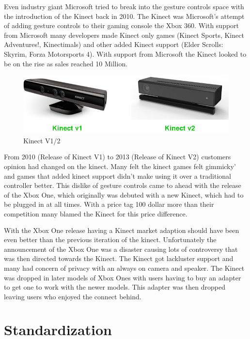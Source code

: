Even industry giant Microsoft tried to break into the gesture controls space with the introduction of the Kinect back in 2010. \cite{kinect} The Kinect was Microsoft's attempt of adding gesture controls to their gaming console the Xbox 360. With support from Microsoft many developers made Kinect only games (Kinect Sports, Kinect Adventures!, Kinectimals) and other added Kinect support (Elder Scrolls: Skyrim, Forza Motorsports 4). With support from Microsoft the Kinect looked to be on the rise as sales reached 10 Million. \cite{kinectsales}

\begin{figure}[H]
  \includegraphics[width=\linewidth]{img/Kinect.png}
  \caption{Kinect V1/2}
  \label{fig:KINECT}
\end{figure}

From 2010 (Release of Kinect V1) to 2013 (Release of Kinect V2) customers opinion had changed on the kinect. Many felt the kinect games felt gimmicky' and games that added kinect support didn't make using it over a traditional controller better. This dislike of gesture controls came to ahead with the release of the Xbox One, which originally was debuted with a new Kinect, which had to be plugged in at all times. With a price tag 100 dollar more than their competition many blamed the Kinect for this price difference. 

With the Xbox One release having a Kinect market adaption should have been even better than the previous iteration of the kinect. Unfortunately the announcement of the Xbox One was  a disaster causing lots of controversy that was then directed towards the Kinect. The Kinect got lackluster support and many had concern of privacy with an always on camera and speaker. The Kinect was dropped in later models of Xbox Ones with users having to buy an adapter to get one to work with the newer models. This adapter was then dropped leaving users who enjoyed the connect behind.

\section{Standardization}



